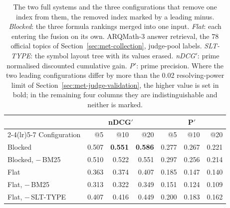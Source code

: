\begin{table}[t]
\centering
\small
\renewcommand{\arraystretch}{1.15}
\begin{tabular}{lrrrrrr}
\toprule
& \multicolumn{3}{c}{nDCG$'$} & \multicolumn{3}{c}{P$'$} \\
\cmidrule(lr){2-4}\cmidrule(lr){5-7}
Configuration & @5 & @10 & @20 & @5 & @10 & @20 \\
\midrule
Blocked                  & 0.507 & \textbf{0.551} & \textbf{0.586} & 0.277 & 0.267 & 0.221 \\
Blocked, $-$\,BM25       & 0.510 & 0.522 & 0.551 & 0.297 & 0.256 & 0.214 \\
\addlinespace
Flat                     & 0.363 & 0.374 & 0.407 & 0.185 & 0.147 & 0.140 \\
Flat, $-$\,BM25          & 0.313 & 0.322 & 0.349 & 0.151 & 0.124 & 0.109 \\
Flat, $-$\,SLT-TYPE      & 0.407 & 0.416 & 0.449 & 0.200 & 0.183 & 0.162 \\
\bottomrule
\end{tabular}
\caption[Removing one index from each full system]{The two full systems and the three configurations that remove one index from them, the
removed index marked by a leading minus. \emph{Blocked}: the three formula rankings merged into
one input. \emph{Flat}: each entering the fusion on its own. ARQMath-3 answer retrieval, the 78
official topics of Section~\ref{sec:met-collection}, judge-pool labels. \emph{SLT-TYPE}: the
symbol layout tree with its values erased. \emph{nDCG$'$}: prime normalised discounted cumulative
gain. \emph{P$'$}: prime precision. Where the two leading configurations differ by more than the
0.02 resolving-power limit of Section~\ref{sec:met-judge-validation}, the higher value is set in
bold; in the remaining four columns they are indistinguishable and neither is marked.}
\label{tab:res-fusion-ablation}
\end{table}


